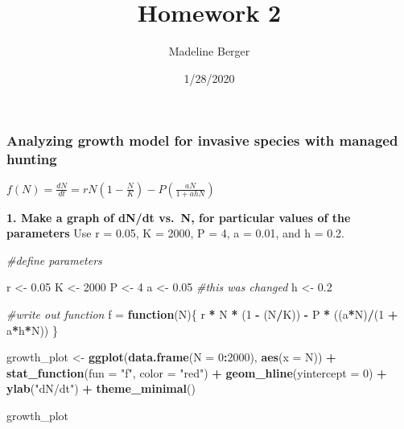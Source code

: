 \documentclass[]{article}
\title{Homework 2}
\author{Madeline Berger}
\date{1/28/2020}
\newenvironment{Shaded}{\begin{snugshade}}{\end{snugshade}}
\newcommand{\KeywordTok}[1]{\textcolor[rgb]{0.13,0.29,0.53}{\textbf{#1}}}
\newcommand{\DataTypeTok}[1]{\textcolor[rgb]{0.13,0.29,0.53}{#1}}
\newcommand{\DecValTok}[1]{\textcolor[rgb]{0.00,0.00,0.81}{#1}}
\newcommand{\FloatTok}[1]{\textcolor[rgb]{0.00,0.00,0.81}{#1}}
\newcommand{\StringTok}[1]{\textcolor[rgb]{0.31,0.60,0.02}{#1}}
\newcommand{\CommentTok}[1]{\textcolor[rgb]{0.56,0.35,0.01}{\textit{#1}}}
\newcommand{\ControlFlowTok}[1]{\textcolor[rgb]{0.13,0.29,0.53}{\textbf{#1}}}
\newcommand{\OperatorTok}[1]{\textcolor[rgb]{0.81,0.36,0.00}{\textbf{#1}}}
\newcommand{\NormalTok}[1]{#1}
\begin{document}
\maketitle

\subsubsection{Analyzing growth model for invasive species with managed
hunting}\label{analyzing-growth-model-for-invasive-species-with-managed-hunting}

\(f(N) = \frac{dN}{dt} = rN(1-\frac{N}{K}) - P(\frac{aN}{1 + ahN})\)

\textbf{1. Make a graph of dN/dt vs.~N, for particular values of the
parameters} Use r = 0.05, K = 2000, P = 4, a = 0.01, and h = 0.2.

\begin{Shaded}
\begin{Highlighting}[]
\CommentTok{#define parameters}

\NormalTok{r <-}\StringTok{ }\FloatTok{0.05}
\NormalTok{K <-}\StringTok{ }\DecValTok{2000}
\NormalTok{P <-}\StringTok{ }\DecValTok{4}
\NormalTok{a <-}\StringTok{ }\FloatTok{0.05} \CommentTok{#this was changed}
\NormalTok{h <-}\StringTok{ }\FloatTok{0.2}

\CommentTok{#write out function}
\NormalTok{f =}\StringTok{ }\ControlFlowTok{function}\NormalTok{(N)\{}
\NormalTok{  r }\OperatorTok{*}\StringTok{ }\NormalTok{N }\OperatorTok{*}\StringTok{ }\NormalTok{(}\DecValTok{1} \OperatorTok{-}\StringTok{ }\NormalTok{(N}\OperatorTok{/}\NormalTok{K)) }\OperatorTok{-}\StringTok{ }\NormalTok{P }\OperatorTok{*}\StringTok{ }\NormalTok{((a}\OperatorTok{*}\NormalTok{N)}\OperatorTok{/}\NormalTok{(}\DecValTok{1} \OperatorTok{+}\StringTok{ }\NormalTok{a}\OperatorTok{*}\NormalTok{h}\OperatorTok{*}\NormalTok{N))}
\NormalTok{\}}

\NormalTok{growth_plot <-}\StringTok{ }\KeywordTok{ggplot}\NormalTok{(}\KeywordTok{data.frame}\NormalTok{(}\DataTypeTok{N =} \DecValTok{0}\OperatorTok{:}\DecValTok{2000}\NormalTok{), }\KeywordTok{aes}\NormalTok{(}\DataTypeTok{x =}\NormalTok{ N)) }\OperatorTok{+}\StringTok{ }
\StringTok{  }\KeywordTok{stat_function}\NormalTok{(}\DataTypeTok{fun =} \StringTok{"f"}\NormalTok{, }\DataTypeTok{color =} \StringTok{"red"}\NormalTok{) }\OperatorTok{+}
\StringTok{  }\KeywordTok{geom_hline}\NormalTok{(}\DataTypeTok{yintercept =} \DecValTok{0}\NormalTok{) }\OperatorTok{+}
\StringTok{  }\KeywordTok{ylab}\NormalTok{(}\StringTok{"dN/dt"}\NormalTok{) }\OperatorTok{+}\StringTok{ }
\StringTok{  }\KeywordTok{theme_minimal}\NormalTok{()}

\NormalTok{growth_plot}
\end{Highlighting}
\end{Shaded}
\end{document}
